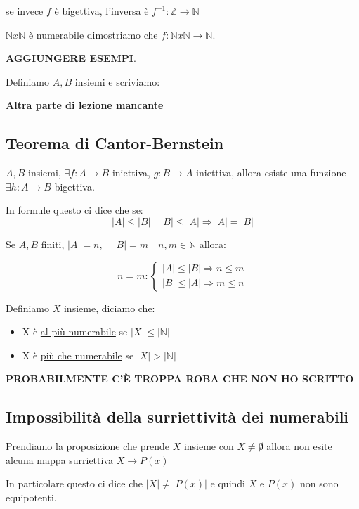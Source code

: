 \documentclass{article}
\begin{document}
se invece $f$ è bigettiva, l'inversa è $f^{-1}: \mathbb{Z} \to \mathbb{N}$


$\mathbb{N} x \mathbb{N}$ è numerabile dimostriamo che $f: \mathbb{N} x \mathbb{N} \to \mathbb{N}$.

\textbf{AGGIUNGERE ESEMPI}.

Definiamo $A,B$ insiemi e scriviamo: 

\textbf{Altra parte di lezione mancante}

\subsection{Teorema di Cantor-Bernstein}
$A,B$ insiemi, $\exists f : A \to B$ iniettiva, $g: B \to A$ iniettiva, allora esiste una funzione $\exists h: A \to B$ bigettiva. \par
In formule questo ci dice che se:
\begin{equation}
        |A| \le |B| \quad |B| \le |A| \Rightarrow |A| = |B|
\end{equation} \newline

Se $A,B$ finiti, $|A| = n, \quad |B|= m \quad n,m \in \mathbb{N}$ allora: 

\[n=m :
\begin{cases}
        |A| \le |B| \Rightarrow n \le m \\
        |B| \le |A| \Rightarrow m \le n
\end{cases}
\]


Definiamo $X$ insieme, diciamo che:
\begin{itemize}
        \item X è \underline{al più numerabile} se $|X| \le |\mathbb{N}|$	
        \item X è \underline{più che numerabile} se $|X| > |\mathbb{N}|$
\end{itemize}

\textbf{PROBABILMENTE C'È TROPPA ROBA CHE NON HO SCRITTO} \newline


\subsection{Impossibilità della surriettività dei numerabili}
Prendiamo la proposizione che prende $X$ insieme con $X \not =  \not 0$ allora non esite alcuna mappa surriettiva $X \to P(x)$ \par
In particolare questo ci dice che $|X| \not = |P(x)|$ e quindi $X$ e $P(x)$ non sono equipotenti.
\end{document}
